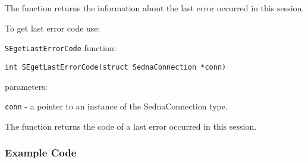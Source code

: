 \documentclass[a4paper,12pt]{article}
\begin{document}
The function returns the information about the last error occurred in this session.

To get last error code use:

\verb!SEgetLastErrorCode! function:

\begin{verbatim}int SEgetLastErrorCode(struct SednaConnection *conn)\end{verbatim}

parameters:

\verb!conn! - a pointer to an instance of the SednaConnection type.

The function returns the code of a last error occurred in this session.






\subsubsection{Example Code}
\end{document}
